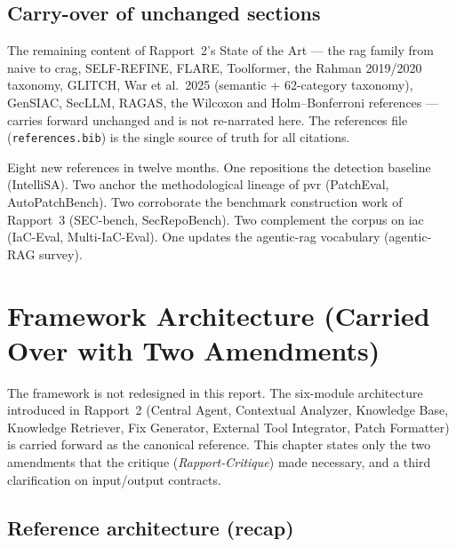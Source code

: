 \documentclass[12pt, a4paper]{report}
\begin{document}
\section{Carry-over of unchanged sections}

The remaining content of Rapport~2's State of the Art --- the \gls{rag}
family from naive to \gls{crag}, SELF-REFINE, FLARE, Toolformer, the Rahman
2019/2020 taxonomy, GLITCH, War et al.~2025 (semantic + 62-category
taxonomy), GenSIAC, SecLLM, RAGAS, the Wilcoxon and Holm--Bonferroni
references --- carries forward unchanged and is not re-narrated here. The
references file (\texttt{references.bib}) is the single source of truth for
all citations.

\begin{findingbox}
Eight new references in twelve months. One repositions the detection
baseline (IntelliSA). Two anchor the methodological lineage of \gls{pvr}
(PatchEval, AutoPatchBench). Two corroborate the benchmark construction
work of Rapport~3 (SEC-bench, SecRepoBench). Two complement the corpus on
\gls{iac} (IaC-Eval, Multi-IaC-Eval). One updates the agentic-\gls{rag}
vocabulary (agentic-RAG survey).
\end{findingbox}

\chapter{Framework Architecture (Carried Over with Two Amendments)}
\label{chap:framework}

The framework is not redesigned in this report. The six-module architecture
introduced in Rapport~2 (Central Agent, Contextual Analyzer, Knowledge Base,
Knowledge Retriever, Fix Generator, External Tool Integrator, Patch
Formatter) is carried forward as the canonical reference. This chapter
states only the two amendments that the critique
(\emph{Rapport-Critique}) made necessary, and a third clarification on
input/output contracts.

\section{Reference architecture (recap)}
\end{document}
